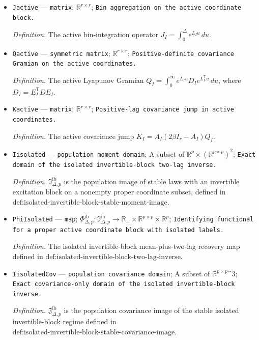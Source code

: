 \documentclass{article}
\begin{document}
\begin{itemize}
  \par\smallskip\noindent\emph{Definition.} The active generator \(L_I=A_I-\beta I_r\).
  \item \texttt{Jactive} --- \texttt{matrix}; \(\mathbb R^{r\times r}\); \texttt{Bin aggregation on the active coordinate block.}
  \par\smallskip\noindent\emph{Definition.} The active bin-integration operator \(J_I=\int_0^\Delta e^{L_Iu}\,du\).
  \item \texttt{Qactive} --- \texttt{symmetric matrix}; \(\mathbb R^{r\times r}\); \texttt{Positive-\allowbreak{}definite covariance Gramian on the active coordinates.}
  \par\smallskip\noindent\emph{Definition.} The active Lyapunov Gramian \(Q_I=\int_0^\infty e^{L_Iu}D_Ie^{L_I^{\mathsf T}u}\,du\), where \(D_I=E_I^{\mathsf T}DE_I\).
  \item \texttt{Kactive} --- \texttt{matrix}; \(\mathbb R^{r\times r}\); \texttt{Positive-\allowbreak{}lag covariance jump in active coordinates.}
  \par\smallskip\noindent\emph{Definition.} The active covariance jump \(K_I=A_I(2\beta I_r-A_I)Q_I\).
  \item \texttt{Iisolated} --- \texttt{population moment domain}; A subset of \(\mathbb R^p\times(\mathbb R^{p\times p})^2\); \texttt{Exact domain of the isolated invertible-\allowbreak{}block two-\allowbreak{}lag inverse.}
  \par\smallskip\noindent\emph{Definition.} \(\mathfrak I_{\Delta,p}^{\mathrm{ib}}\) is the population image of stable laws with an invertible excitation block on a nonempty proper coordinate subset, defined in \(\text{def:isolated-invertible-block-stable-moment-image}\).
  \item \texttt{PhiIsolated} --- \texttt{map}; \(\Phi_{\Delta,p}^{\mathrm{ib}}:\mathfrak I_{\Delta,p}^{\mathrm{ib}}\to\mathbb R_+\times\mathbb R^{p\times p}\times\mathbb R^p\); \texttt{Identifying functional for a proper active coordinate block with isolated labels.}
  \par\smallskip\noindent\emph{Definition.} The isolated invertible-block mean-plus-two-lag recovery map defined in \(\text{def:isolated-invertible-block-two-lag-inverse}\).
  \item \texttt{IisolatedCov} --- \texttt{population covariance domain}; A subset of \(\mathbb R^{p\times p}\)\textasciicircum{}3; \texttt{Exact covariance-\allowbreak{}only domain of the isolated invertible-\allowbreak{}block inverse.}
  \par\smallskip\noindent\emph{Definition.} \(\mathfrak J_{\Delta,p}^{\mathrm{ib}}\) is the population covariance image of the stable isolated invertible-block regime defined in \(\text{def:isolated-invertible-block-stable-covariance-image}\).

\end{itemize}
\end{document}
